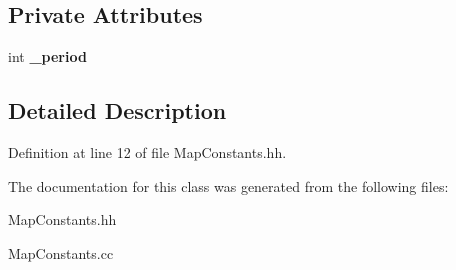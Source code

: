 \subsection*{Private Attributes}
\begin{DoxyCompactItemize}
\item 
int {\bfseries \-\_\-period}\label{classTBTrack_1_1MapConstants_a136a931938bf1830db32ecd17745e4a5}

\end{DoxyCompactItemize}


\subsection{Detailed Description}


Definition at line 12 of file Map\-Constants.\-hh.



The documentation for this class was generated from the following files\-:\begin{DoxyCompactItemize}
\item 
Map\-Constants.\-hh\item 
Map\-Constants.\-cc\end{DoxyCompactItemize}
